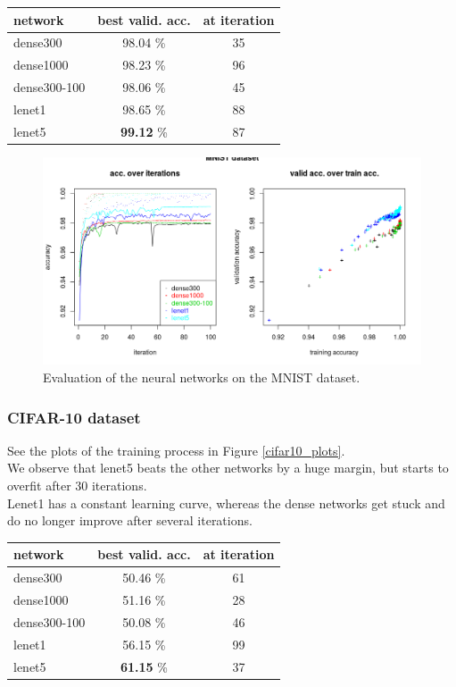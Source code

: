 \begin{tabular}{|l|c|c|}
 \hline
 network & best valid. acc. & at iteration\\ \hline
 dense300 & 98.04 \% & 35\\
 dense1000 & 98.23 \% & 96\\
 dense300-100 & 98.06 \% & 45\\
 lenet1 & 98.65 \% & 88\\
 lenet5 & \textbf{99.12} \% & 87\\
 \hline
\end{tabular}

\begin{figure}
 \includegraphics[width=\textwidth]{../plots/nn_mnist}
 \caption{Evaluation of the neural networks on the MNIST dataset.}
 \label{mnist_plots}
\end{figure}


\subsubsection{CIFAR-10 dataset}

See the plots of the training process in Figure \ref{cifar10_plots}.\\
We observe that lenet5 beats the other networks by a huge margin,
but starts to overfit after 30 iterations.\\
Lenet1 has a constant learning curve, whereas the dense networks
get stuck and do no longer improve after several iterations.\\

\begin{tabular}{|l|c|c|}
 \hline
 network & best valid. acc. & at iteration\\ \hline
 dense300 & 50.46 \% & 61\\
 dense1000 & 51.16 \% & 28\\
 dense300-100 & 50.08 \% & 46\\
 lenet1 & 56.15 \% & 99\\
 lenet5 & \textbf{61.15} \% & 37\\
 \hline
\end{tabular}\\

